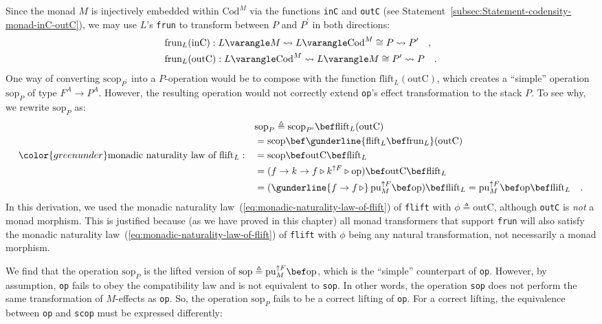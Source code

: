 Since the monad $M$ is injectively embedded within $\text{Cod}^{M}$
via the functions \lstinline!inC! and \lstinline!outC! (see Statement~\ref{subsec:Statement-codensity-monad-inC-outC}),
we may use $L$\textsf{'}s \lstinline!frun! to transform between $P$ and
$P^{\prime}$ in both directions:
\begin{align*}
 & \text{frun}_{L}(\text{inC}):L\varangle M\leadsto L\varangle\text{Cod}^{M}\cong P\leadsto P^{\prime}\quad,\\
 & \text{frun}_{L}(\text{outC}):L\varangle\text{Cod}^{M}\leadsto L\varangle M\cong P^{\prime}\leadsto P\quad.
\end{align*}
One way of converting $\text{scop}_{P^{\prime}}$ into a $P$-operation
would be to compose with the function $\text{flift}_{L}(\text{outC})$,
which creates a \textsf{``}simple\textsf{''} operation $\text{sop}_{P}$ of type $F^{A}\rightarrow P^{A}$.
However, the resulting operation would not correctly extend \lstinline!op!\textsf{'}s
effect transformation to the stack $P$. To see why, we rewrite $\text{sop}_{P}$
as:
\begin{align*}
 & \text{sop}_{P}\triangleq\text{scop}_{P^{\prime}}\bef\text{flift}_{L}(\text{outC})\\
 & =\text{scop}\bef\gunderline{\text{flift}_{L}\bef\text{frun}_{L}}(\text{outC})\\
{\color{greenunder}\text{monadic naturality law of }\text{flift}_{L}:}\quad & =\text{scop}\bef\text{outC}\bef\text{flift}_{L}\\
 & =(f\rightarrow k\rightarrow f\triangleright k^{\uparrow F}\triangleright\text{op})\bef\text{outC}\bef\text{flift}_{L}\\
 & =(\gunderline{f\rightarrow f\,\triangleright}\,\text{pu}_{M}^{\uparrow F}\bef\text{op})\bef\text{flift}_{L}=\text{pu}_{M}^{\uparrow F}\bef\text{op}\bef\text{flift}_{L}\quad.
\end{align*}
In this derivation, we used the monadic naturality law~(\ref{eq:monadic-naturality-law-of-flift})
of \lstinline!flift! with $\phi\triangleq\text{outC}$, although
\lstinline!outC! is \emph{not} a monad morphism. This is justified
because (as we have proved in this chapter) all monad transformers
that support \lstinline!frun! will also satisfy the monadic naturality
law~(\ref{eq:monadic-naturality-law-of-flift}) of \lstinline!flift!
with $\phi$ being any natural transformation, not necessarily a monad
morphism. 

We find that the operation $\text{sop}_{P}$ is the lifted version
of $\text{sop}\triangleq\text{pu}_{M}^{\uparrow F}\bef\text{op}$,
which is the \textsf{``}simple\textsf{''} counterpart of \lstinline!op!. However,
by assumption, \lstinline!op! fails to obey the compatibility law
and is not equivalent to \lstinline!sop!. In other words, the operation
\lstinline!sop! does not perform the same transformation of $M$-effects
as \lstinline!op!. So, the operation $\text{sop}_{P}$ fails to be
a correct lifting of \lstinline!op!. For a correct lifting, the equivalence
between \lstinline!op! and \lstinline!scop! must be expressed differently:

